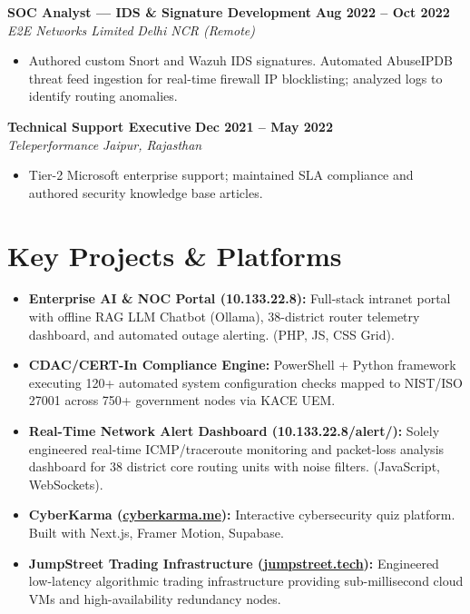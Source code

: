 \documentclass[10pt,a4paper]{article}
\newcommand{\resumeRole}[4]{
  \vspace{3pt}
  {\textbf{\small #1}} \hfill {\footnotesize\textbf{#2}} \\[-2pt]
  {\footnotesize\textit{\color{medgray}#3}} \hfill {\footnotesize\textit{\color{medgray}#4}}
  \vspace{1pt}
}
\begin{document}
\resumeRole
  {SOC Analyst --- IDS \& Signature Development}{Aug 2022 -- Oct 2022}
  {E2E Networks Limited}{Delhi NCR (Remote)}
\begin{itemize}[leftmargin=0.15in, itemsep=1pt, topsep=1pt]
  \item \footnotesize Authored custom Snort and Wazuh IDS signatures. Automated AbuseIPDB threat feed ingestion for real-time firewall IP blocklisting; analyzed logs to identify routing anomalies.
\end{itemize}

\resumeRole
  {Technical Support Executive}{Dec 2021 -- May 2022}
  {Teleperformance}{Jaipur, Rajasthan}
\begin{itemize}[leftmargin=0.15in, itemsep=1pt, topsep=1pt]
  \item \footnotesize Tier-2 Microsoft enterprise support; maintained SLA compliance and authored security knowledge base articles.
\end{itemize}

\section{Key Projects \& Platforms}
\begin{itemize}[leftmargin=0.15in, itemsep=1pt, topsep=1pt]
  \item \footnotesize\textbf{Enterprise AI \& NOC Portal (10.133.22.8):} Full-stack intranet portal with offline RAG LLM Chatbot (Ollama), 38-district router telemetry dashboard, and automated outage alerting. (PHP, JS, CSS Grid).
  \item \footnotesize\textbf{CDAC/CERT-In Compliance Engine:} PowerShell + Python framework executing 120+ automated system configuration checks mapped to NIST/ISO 27001 across 750+ government nodes via KACE UEM.
  \item \footnotesize\textbf{Real-Time Network Alert Dashboard (10.133.22.8/alert/):} Solely engineered real-time ICMP/traceroute monitoring and packet-loss analysis dashboard for 38 district core routing units with noise filters. (JavaScript, WebSockets).
  \item \footnotesize\textbf{CyberKarma (\href{https://cyberkarma.me}{cyberkarma.me}):} Interactive cybersecurity quiz platform. Built with Next.js, Framer Motion, Supabase.
  \item \footnotesize\textbf{JumpStreet Trading Infrastructure (\href{https://jumpstreet.tech}{jumpstreet.tech}):} Engineered low-latency algorithmic trading infrastructure providing sub-millisecond cloud VMs and high-availability redundancy nodes.
\end{itemize}
\end{document}
